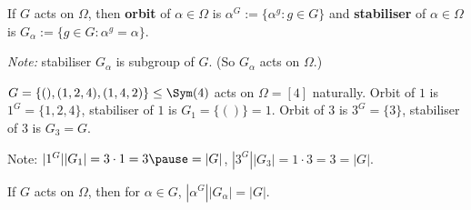 \begin{slide}
    \begin{definition}
        \vspace{0pt}
        If $G$ acts on $\Omega$, then \textbf{orbit} of $\alpha \in \Omega$ is $\alpha^G := \{\alpha^g : g \in G\}$ and \textbf{stabiliser} of $\alpha \in \Omega$ is $G_\alpha := \{g \in G : \alpha^g = \alpha\}$.
    \end{definition}

    \textit{Note:} stabiliser $G_\alpha$ is subgroup of $G$. (So $G_\alpha$ acts on $\Omega$.)

    \begin{example}
        \vspace{0pt}
        $G = \{(),(1,2,4),(1,4,2)\} \leq \Sym(4)$ acts on $\Omega = [4]$ naturally. Orbit of $1$ is \pause $1^G = \{1,2,4\}$, stabiliser of $1$ is \pause $G_1 = \{()\} = 1$. Orbit of $3$ is \pause $3^G = \{3\}$, stabiliser of $3$ is \pause $G_3 = G$. \pause

        Note: $|1^G||G_1| = 3 \cdot 1 = 3 \pause = |G|$, \pause $|3^G||G_3| = 1 \cdot 3 = 3 = |G|$.
    \end{example} \pause

    \begin{theorem}
        \vspace{0pt}
        If $G$ acts on $\Omega$, then for $\alpha \in G$, $|\alpha^G||G_\alpha| = |G|$.
    \end{theorem}
\end{slide}